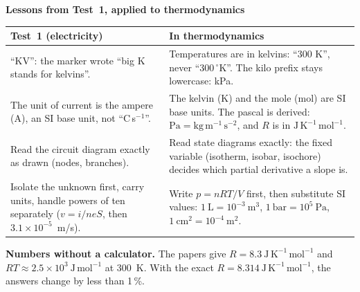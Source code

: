 \documentclass{ibetest}
\begin{document}
\vspace{7mm}
{\sffamily\bfseries\large Lessons from Test~1, applied to thermodynamics}\par\vspace{3mm}
\begin{center}
\small
\begin{tabular}{@{}>{\raggedright\arraybackslash}p{58mm} >{\raggedright\arraybackslash}p{92mm}@{}}
\hline
\textbf{Test~1 (electricity)} & \textbf{In thermodynamics}\\
\hline
``KV'': the marker wrote ``big K stands for kelvins''. &
  Temperatures are in kelvins: ``300 K'', never ``300\,$^\circ$K''. The kilo prefix stays
  lowercase: kPa.\\ \hline
The unit of current is the ampere (A), an SI base unit, not ``C\,s$^{-1}$''. &
  The kelvin (K) and the mole (mol) are SI base units. The pascal is derived:
  $\mathrm{Pa} = \mathrm{kg\,m^{-1}\,s^{-2}}$, and $R$ is in $\mathrm{J\,K^{-1}\,mol^{-1}}$.\\
  \hline
Read the circuit diagram exactly as drawn (nodes, branches). &
  Read state diagrams exactly: the fixed variable (isotherm, isobar, isochore) decides which
  partial derivative a slope is.\\ \hline
Isolate the unknown first, carry units, handle powers of ten separately
($v = i/neS$, then $3.1\times10^{-5}$~m/s). &
  Write $p = nRT/V$ first, then substitute SI values: $1\ \mathrm L = 10^{-3}\ \mathrm{m^3}$,
  $1\ \mathrm{bar} = 10^{5}\ \mathrm{Pa}$, $1\ \mathrm{cm^2} = 10^{-4}\ \mathrm{m^2}$.\\ \hline
\end{tabular}
\end{center}

\vspace{6mm}
\begin{tcolorbox}[enhanced, colback=black!3, colframe=black!45, boxrule=0.4pt, arc=1mm,
  fontupper=\small]
\textbf{Numbers without a calculator.} The papers give $R = 8.3\ \mathrm{J\,K^{-1}\,mol^{-1}}$
and $RT\approx2.5\times10^{3}\ \mathrm{J\,mol^{-1}}$ at 300~K. With the exact
$R = 8.314\ \mathrm{J\,K^{-1}\,mol^{-1}}$, the answers change by less than 1\,\%.
\end{tcolorbox}
\end{document}
